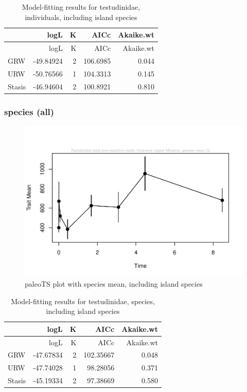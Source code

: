 \documentclass[]{article}
\begin{document}
\begin{longtable}[]{@{}lrrrr@{}}
\caption{Model-fitting results for testudinidae, individuals, including
island species}\tabularnewline
\toprule
& logL & K & AICc & Akaike.wt\tabularnewline
\midrule
\endfirsthead
\toprule
& logL & K & AICc & Akaike.wt\tabularnewline
\midrule
\endhead
GRW & -49.84924 & 2 & 106.6985 & 0.044\tabularnewline
URW & -50.76566 & 1 & 104.3313 & 0.145\tabularnewline
Stasis & -46.94604 & 2 & 100.8921 & 0.810\tabularnewline
\bottomrule
\end{longtable}

\newpage

\subsubsection{species (all)}\label{species-all}

\begin{figure}[htbp]
\centering
\includegraphics{MA_JJ_files/figure-latex/paleoTS plot with species mean, including island species-1.pdf}
\caption{paleoTS plot with species mean, including island species}
\end{figure}

\begin{longtable}[]{@{}lrrrr@{}}
\caption{Model-fitting results for testudinidae, species, including
island species}\tabularnewline
\toprule
& logL & K & AICc & Akaike.wt\tabularnewline
\midrule
\endfirsthead
\toprule
& logL & K & AICc & Akaike.wt\tabularnewline
\midrule
\endhead
GRW & -47.67834 & 2 & 102.35667 & 0.048\tabularnewline
URW & -47.74028 & 1 & 98.28056 & 0.371\tabularnewline
Stasis & -45.19334 & 2 & 97.38669 & 0.580\tabularnewline
\bottomrule
\end{longtable}
\end{document}

